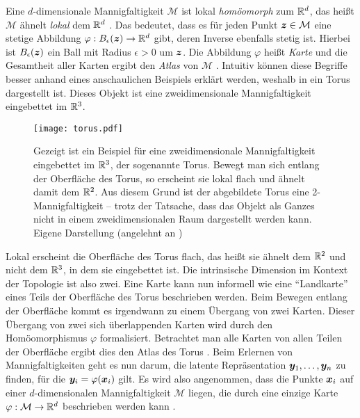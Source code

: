 Eine $d$-dimensionale Mannigfaltigkeit $\mathcal{M}$ ist lokal \textit{homöomorph} zum $\mathbb{R}^d$,
das heißt $\mathcal{M}$ ähnelt \textit{lokal} dem $\mathbb{R}^d$ \parencite[3]{Lee.2011}. Das bedeutet, dass es für jeden Punkt $\bm{z} \in \mathcal{M}$ eine stetige
Abbildung $\varphi: B_\epsilon(\bm{z}) \rightarrow \mathbb{R}^d$ gibt, deren Inverse ebenfalls stetig
ist. Hierbei ist $B_\epsilon(\bm{z})$ ein Ball mit Radius $\epsilon > 0$ um $\bm{z}$. Die
Abbildung $\varphi$ heißt \textit{Karte} und die Gesamtheit aller Karten ergibt den \textit{Atlas}
von $\mathcal{M}$ \parencite[4]{Cayton.2005}. Intuitiv können diese Begriffe besser anhand eines anschaulichen Beispiels
erklärt werden, weshalb in  ein Torus dargestellt ist. Dieses Objekt ist eine
zweidimensionale Mannigfaltigkeit eingebettet im $\mathbb{R}^3$.
\begin{figure}[ht]
	\centering
	\texttt{[image: torus.pdf]}
	\caption[Ein Beispiel für eine zweidimensionale Mannigfaltigkeit: ein Torus]{Gezeigt ist ein Beispiel für eine zweidimensionale Mannigfaltigkeit eingebettet im $\mathbb{R}^3$, der sogenannte Torus. Bewegt man sich entlang der Oberfläche des Torus, so erscheint sie lokal flach und ähnelt damit dem $\mathbb{R}^2$. Aus diesem Grund ist der abgebildete Torus eine 2-Mannigfaltigkeit -- trotz der Tatsache, dass das Objekt als Ganzes nicht in einem zweidimensionalen Raum dargestellt werden kann. Eigene Darstellung (angelehnt an \textcite[350]{Hill.2020})}
	\label{fig:Torus}
\end{figure}
Lokal erscheint die Oberfläche des Torus flach, das heißt sie ähnelt dem $\mathbb{R}^2$ und nicht dem $\mathbb{R}^3$, in dem sie eingebettet ist. Die intrinsische Dimension im Kontext der Topologie ist also zwei. Eine Karte kann nun informell wie eine \enquote{Landkarte} eines Teils der Oberfläche des Torus beschrieben werden. Beim Bewegen entlang der Oberfläche kommt es irgendwann zu einem Übergang von zwei Karten. Dieser Übergang von zwei sich
überlappenden Karten wird durch den Homöomorphismus $\varphi$ formalisiert. Betrachtet man alle Karten
von allen Teilen der Oberfläche ergibt dies den Atlas des Torus \parencite[4, 12]{Lee.2012}. Beim Erlernen von Mannigfaltigkeiten geht es nun darum, die latente
Repräsentation $\bm{y}_1, \ldots, \bm{y}_n$ zu finden, für die $\bm{y}_i =
	\varphi(\bm{x}_i)$ gilt. Es wird also angenommen, dass die Punkte $\bm{x}_i$ auf einer
$d$-dimensionalen Mannigfaltigkeit $\mathcal{M}$ liegen, die durch eine einzige Karte $\varphi:
	\mathcal{M} \rightarrow \mathbb{R}^d$ beschrieben werden kann \parencite[4]{Cayton.2005}.

